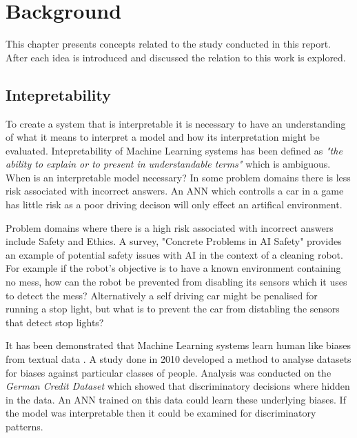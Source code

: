 \chapter{Background}\label{C:backgroundsurvey}
This chapter presents concepts related to the study conducted in this report. After each idea is introduced and discussed the relation to this work is explored.

\section{Intepretability}
To create a system that is interpretable it is necessary to have an understanding of what it means to interpret a model and how its interpretation might be evaluated. Intepretability of Machine Learning systems has been defined as \textit{"the ability to explain or to present in understandable terms"} \cite{doshi2017towards} which is ambiguous.\\

When is an interpretable model necessary? \cite{doshi2017towards} In some problem domains there is less risk associated with incorrect answers. An ANN which controlls a car in a game has little risk as a poor driving decison will only effect an artifical environment.

Problem domains where there is a high risk associated with incorrect answers include Safety and Ethics. A survey, "Concrete Problems in AI Safety" \cite{amodei2016concrete} provides an example of potential safety issues with AI in the context of a cleaning robot.  For example if the robot's objective is to have a known environment containing no mess, how can the robot be prevented from disabling its sensors which it uses to detect the mess? Alternatively a self driving car might be penalised for running a stop light, but what is to prevent the car from distabling the sensors that detect stop lights?

It has been demonstrated that Machine Learning systems learn human like biases from textual data \cite{caliskan2017semantics}. A study done in 2010 \cite{ruggieri2010data} developed a method to analyse datasets for biases against particular classes of people. Analysis was conducted on the \textit{German Credit Dataset} which showed that discriminatory decisions where hidden in the data. An ANN trained on this data could learn these underlying biases. If the model was interpretable then it could be examined for discriminatory patterns.\\

